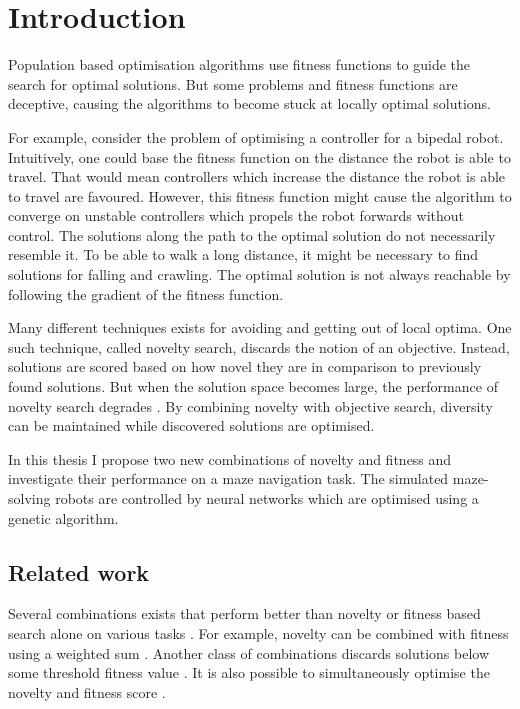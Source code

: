 \section{Introduction}

\label{sec:intro}

Population based optimisation algorithms use fitness functions to guide the search for optimal solutions.
But some problems and fitness functions are deceptive, causing the algorithms to become stuck at
locally optimal solutions.

For example, consider the problem of optimising a controller for a bipedal
robot. Intuitively, one could base the fitness function on the distance the robot is able to travel.
That would mean controllers which increase the distance the robot is able to travel are favoured.
However, this fitness function might cause the algorithm to converge on unstable controllers which
propels the robot forwards without control. The solutions along the path to the optimal solution
do not necessarily resemble it. To be able to walk a long distance, it might be necessary to find
solutions for falling and crawling. The optimal solution is not always reachable by following
the gradient of the fitness function.

Many different techniques exists for avoiding and getting out of local optima. One such technique, called
novelty search, discards the notion of an objective. Instead, solutions are scored based on how novel
they are in comparison to previously found solutions. But when the solution space becomes large, the performance
of novelty search degrades \cite{novelty_not_enough}. By combining novelty with objective search, diversity
can be maintained while discovered solutions are optimised.

In this thesis I propose two new combinations of novelty and fitness and investigate their performance
on a maze navigation task. The simulated maze-solving robots are controlled by
neural networks which are optimised using a genetic algorithm.

\subsection{Related work}
Several combinations exists that perform better than novelty or fitness based search alone
on various tasks \cite{ns_study}. For example, novelty can be combined with fitness using a
weighted sum \cite{novelty_not_enough}. Another class of combinations discards solutions below
some threshold fitness value \cite{minimal_ns}. It is also possible to simultaneously optimise
the novelty and fitness score \cite{multi_ns}.
